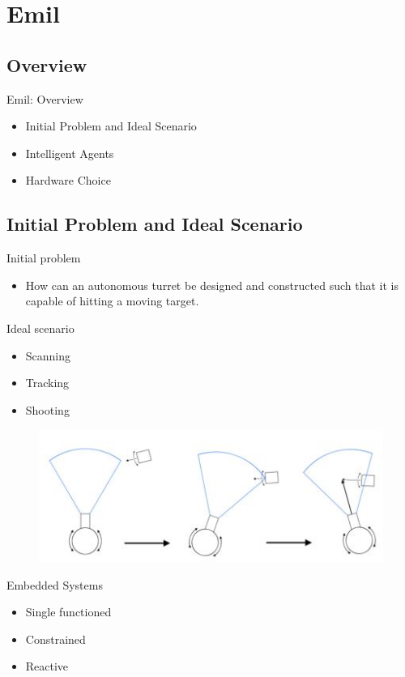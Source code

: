 \section{Emil}
\subsection{Overview}
\begin{frame}{Emil: Overview}
\begin{itemize}
  \item Initial Problem and Ideal Scenario
  \item Intelligent Agents
  \item Hardware Choice
\end{itemize}
\end{frame}
 
\subsection{Initial Problem and Ideal Scenario}
\begin{frame}{Initial problem}
\begin{itemize}
\item How can an autonomous turret be designed and constructed such
that it is capable of hitting a moving target.
\end{itemize}
\end{frame}

\begin{frame}{Ideal scenario}
\begin{itemize}
  \item Scanning
  \item Tracking
  \item Shooting
\end{itemize}
\begin{figure}[H]
  \includegraphics[scale=0.6]{figures/ideal.JPG}
\end{figure}
\end{frame}

\begin{frame}{Embedded Systems}
\begin{itemize}
  \item Single functioned
  \item Constrained
  \item Reactive
\end{itemize}
\end{frame}

